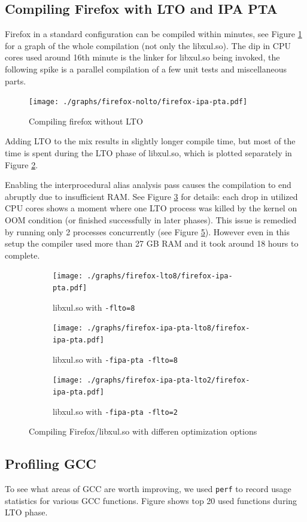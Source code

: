 \subsection{Compiling Firefox with LTO and IPA PTA}

Firefox in a standard configuration can be compiled within minutes, see Figure
\ref{figure-firefox-nolto} for a graph of the whole compilation (not only the
libxul.so). The dip in CPU cores used around 16th minute is the linker for
libxul.so being invoked, the following spike is a parallel compilation of a few
unit tests and miscellaneous parts.

\begin{figure}[h!]
	\label{figure-firefox-nolto}
	\centering
	\texttt{[image: ./graphs/firefox-nolto/firefox-ipa-pta.pdf]}
	\caption{Compiling firefox without LTO}
\end{figure}

Adding LTO to the mix results in slightly longer compile time, but most of the
time is spent during the LTO phase of libxul.so, which is plotted separately in
Figure \ref{figure-firefox-lto8}.

Enabling the interprocedural alias analysis pass causes the compilation to end
abruptly due to insufficient RAM.  See Figure \ref{figure-firefox-ipa-pta-lto8}
for details: each drop in utilized CPU cores shows a moment where one LTO
process was killed by the kernel on OOM condition (or finished successfully in
later phases). This issue is remedied by running only 2 processes concurrently
(see Figure \ref{figure-firefox-ipa-pta-lto2}).  However even in this setup the
compiler used more than 27 GB RAM and it took around 18 hours to complete.


\begin{figure}
\begin{subfigure}[b]{\textwidth}
	\label{figure-firefox-lto8}
	\centering
	\texttt{[image: ./graphs/firefox-lto8/firefox-ipa-pta.pdf]}
	\caption{libxul.so with {\tt -flto=8}}
\end{subfigure}
\begin{subfigure}[b]{\textwidth}
	\label{figure-firefox-ipa-pta-lto8}
	\centering
	\texttt{[image: ./graphs/firefox-ipa-pta-lto8/firefox-ipa-pta.pdf]}
	\caption{libxul.so with {\tt -fipa-pta -flto=8}}
\end{subfigure}
\begin{subfigure}[b]{\textwidth}
	\label{figure-firefox-ipa-pta-lto2}
	\centering
	\texttt{[image: ./graphs/firefox-ipa-pta-lto2/firefox-ipa-pta.pdf]}
	\caption{libxul.so with {\tt -fipa-pta -flto=2}}
\end{subfigure}
\caption{Compiling Firefox/libxul.so with differen optimization options}
\end{figure}

\subsection{Profiling GCC}

To see what areas of GCC are worth improving, we used {\tt perf} to record usage
statistics for various GCC functions. Figure  shows top 20 used
functions during LTO phase.



\noindent




